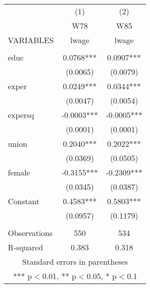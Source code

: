 \documentclass[]{article}
\begin{document}
\begin{tabular}{lcc} \hline
 & (1) & (2) \\
 & W78 & W85 \\
VARIABLES & lwage & lwage \\ \hline
 &  &  \\
educ & 0.0768*** & 0.0907*** \\
 & (0.0065) & (0.0079) \\
exper & 0.0249*** & 0.0344*** \\
 & (0.0047) & (0.0054) \\
expersq & -0.0003*** & -0.0005*** \\
 & (0.0001) & (0.0001) \\
union & 0.2040*** & 0.2022*** \\
 & (0.0369) & (0.0505) \\
female & -0.3155*** & -0.2309*** \\
 & (0.0345) & (0.0387) \\
Constant & 0.4583*** & 0.5803*** \\
 & (0.0957) & (0.1179) \\
 &  &  \\
Observations & 550 & 534 \\
 R-squared & 0.383 & 0.318 \\ \hline
\multicolumn{3}{c}{ Standard errors in parentheses} \\
\multicolumn{3}{c}{ *** p$<$0.01, ** p$<$0.05, * p$<$0.1} \\
\end{tabular}
\end{document}

